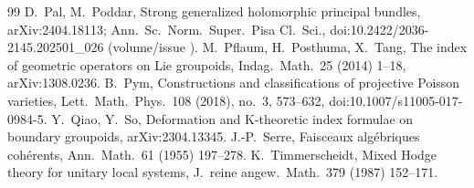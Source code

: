 \begin{thebibliography}{99}
 D.\ Pal, M.\ Poddar, Strong generalized holomorphic principal bundles, arXiv:2404.18113; Ann.\ Sc.\ Norm.\ Super.\ Pisa Cl.\ Sci., doi:10.2422/2036-2145.202501\_026 (volume/issue \tQ).
 M.\ Pflaum, H.\ Posthuma, X.\ Tang, The index of geometric operators on Lie groupoids, Indag.\ Math.\ 25 (2014) 1--18, arXiv:1308.0236.
 B.\ Pym, Constructions and classifications of projective Poisson varieties, Lett.\ Math.\ Phys.\ 108 (2018), no.\ 3, 573--632, doi:10.1007/s11005-017-0984-5.
 Y.\ Qiao, Y.\ So, Deformation and K-theoretic index formulae on boundary groupoids, arXiv:2304.13345.
 J.-P.\ Serre, Faisceaux alg\'ebriques coh\'erents, Ann.\ Math.\ 61 (1955) 197--278.
 K.\ Timmerscheidt, Mixed Hodge theory for unitary local systems, J.\ reine angew.\ Math.\ 379 (1987) 152--171.
\end{thebibliography}

